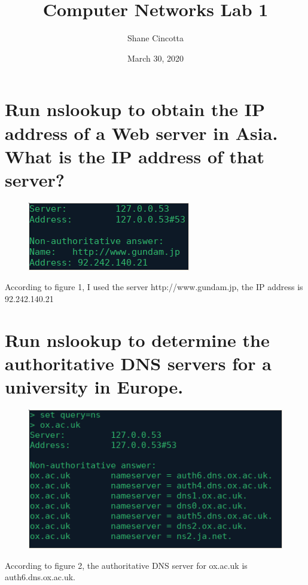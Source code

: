 \documentclass{article}
\title{Computer Networks Lab 1}
\author{Shane Cincotta }
\date{March 30, 2020}
\begin{document}
\maketitle

\section{Run nslookup to obtain the IP address of a Web server in Asia. What is the IP
address of that server?}

\begin{figure}[h!]
\centering
\includegraphics[scale=0.65]{Q1.png}
\caption{}
\end{figure}

According to figure 1, I used the server http://www.gundam.jp, the IP address is 92.242.140.21 \\

\section{Run nslookup to determine the authoritative DNS servers for a university in
Europe.}

\begin{figure}[h!]
\centering
\includegraphics[scale=0.65]{Q2.png}
\caption{}
\end{figure}

According to figure 2, the authoritative DNS server for ox.ac.uk is auth6.dns.ox.ac.uk.\\

\clearpage
\end{document}
